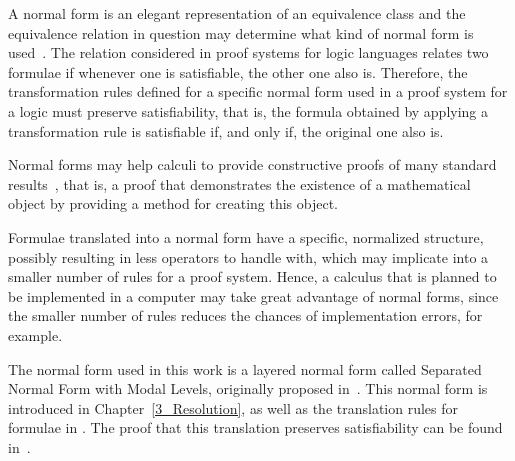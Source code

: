 A normal form is an elegant representation of an equivalence class and the
equivalence relation in question may determine what kind of normal form is
used~\cite{normalformtheory}. The relation considered in proof systems for logic
languages relates two formulae if whenever one is satisfiable, the other one
also is. Therefore, the transformation rules defined for a specific normal form
used in a proof system for a logic must preserve satisfiability, that is, the
formula obtained by applying a transformation rule is satisfiable if, and only
if, the original one also is. 

Normal forms may help calculi to provide constructive proofs of many standard
results~\cite{fine1975}, that is, a proof that demonstrates the existence of a
mathematical object by providing a method for creating this object. 

Formulae translated into a normal form have a specific, normalized structure,
possibly resulting in less operators to handle with, which may implicate into a
smaller number of rules for a proof system. Hence, a calculus that is planned to
be implemented in a computer may take great advantage of normal forms, since the
smaller number of rules reduces the chances of implementation errors, for
example. 

The normal form used in this work is a layered normal form called Separated
Normal Form with Modal Levels, originally proposed
in~\cite{journals/jal/NalonD07}. This normal form is introduced in
Chapter~\ref{3_Resolution}, as well as the translation rules for formulae in
. The proof that this translation preserves satisfiability can be
found in~\cite{journals/jal/NalonD07}.

